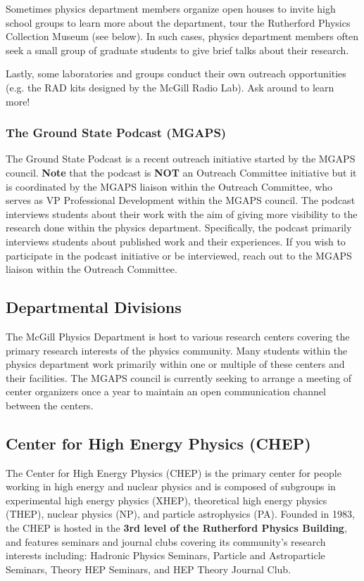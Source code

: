 Sometimes physics department members organize open houses to invite high school groups to learn more about the department, tour the Rutherford Physics Collection Museum (see below). In such cases, physics department members often seek a small group of graduate students to give brief talks about their research. 

Lastly, some laboratories and groups conduct their own outreach opportunities (e.g. the RAD kits designed by the McGill Radio Lab). Ask around to learn more!

\subsubsection{The Ground State Podcast (MGAPS)}
The Ground State Podcast is a recent outreach initiative started by the MGAPS council. \textbf{Note} that the podcast is \textbf{NOT} an Outreach Committee initiative but it is coordinated by the MGAPS liaison within the Outreach Committee, who serves as VP Professional Development within the MGAPS council. The podcast interviews students about their work with the aim of giving more visibility to the research done within the physics department. Specifically, the podcast primarily interviews students about published work and their experiences. If you wish to participate in the podcast initiative or be interviewed, reach out to the MGAPS liaison within the Outreach Committee.


\subsection{Departmental Divisions}
The McGill Physics Department is host to various research centers covering the primary research interests of the physics community. Many students within the physics department work primarily within one or multiple of these centers and their facilities. The MGAPS council is currently seeking to arrange a meeting of center organizers once a year to maintain an open communication channel between the centers.  

\subsection*{Center for High Energy Physics (CHEP)}
The Center for High Energy Physics (CHEP) is the primary center for people working in high energy and nuclear physics and is composed of subgroups in experimental high energy physics (XHEP), theoretical high energy physics (THEP), nuclear physics (NP), and particle astrophysics (PA). Founded in 1983, the CHEP is hosted in the \textbf{3rd level of the Rutherford Physics Building}, and features seminars and journal clubs covering its community's research interests including: Hadronic Physics Seminars, Particle and Astroparticle Seminars, Theory HEP Seminars, and HEP Theory Journal Club. 

